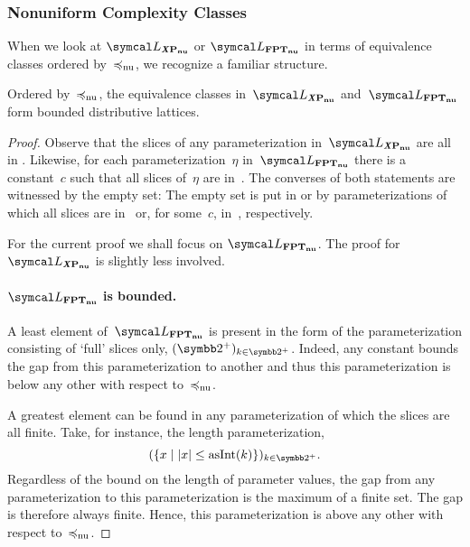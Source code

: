\subsubsection{Nonuniform Complexity Classes}
When we look at $\calL_\clXnu{P}$ or $\calL_\clnu{FPT}$ in terms of equivalence classes ordered by~$\preccurlyeq_\mathrm{nu}$, we recognize a familiar \parencite{davey2002introduction} structure.
\begin{theorem}
\label{thm:nulattice}%
  Ordered by~$\preccurlyeq_\mathrm{nu}$, the equivalence classes in~$\calL_\clXnu{P}$ and~$\calL_\clnu{FPT}$ form bounded distributive lattices.
\end{theorem}
\begin{proof}
  Observe that the slices of any parameterization in~$\calL_\clXnu{P}$ are all in .
  Likewise, for each parameterization~$\eta$ in~$\calL_\clnu{FPT}$ there is a constant~$c$ such that all slices of~$\eta$ are in~.
  The converses of both statements are witnessed by the empty set:
  The empty set is put in  or  by parameterizations of which all slices are in~ or, for some~$c$, in~, respectively.

  For the current proof we shall focus on $\calL_\clnu{FPT}$.
  The proof for $\calL_\clXnu{P}$ is slightly less involved.

  \paragraph{$\calL_\clnu{FPT}$ is bounded.}
  A least element of~$\calL_\clnu{FPT}$ is present in the form of the parameterization consisting of `full' slices only, $(\binary^+)_{k \in \binary^+}$.
  Indeed, any constant bounds the gap from this parameterization to another and thus this parameterization is below any other with respect to~$\preccurlyeq_\mathrm{nu}$.

  A greatest element can be found in any parameterization of which the slices are all finite.
  Take, for instance, the length parameterization,
  \begin{equation*}
    (\{x \st \length{x} \le \asNat(k)\})_{k \in \binary^+}.
  \end{equation*}
  Regardless of the bound on the length of parameter values, the gap from any parameterization to this parameterization is the maximum of a finite set.
  The gap is therefore always finite.
  Hence, this parameterization is above any other with respect to~$\preccurlyeq_\mathrm{nu}$.


\end{proof}
